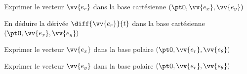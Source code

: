 \debutEntrainement


\begin{enonce}
	Exprimer le vecteur  $\vv{e_r}$ dans la base 
	cartésienne $(\ptO, \vv{e_x}, \vv{e_y})$
\end{enonce}





\begin{enonce}
En déduire la dérivée  $\diff{\vv{e_r}}{t}$ dans la base 
cartésienne $(\ptO, \vv{e_x}, \vv{e_y})$
\end{enonce}





\begin{enonce}
	Exprimer le vecteur   $\vv{e_x}$ dans la base 
	polaire $(\ptO, \vv{e_r}, \vv{e_\theta})$
\end{enonce}





\begin{enonce}
	Exprimer le vecteur  $\vv{e_y}$ dans la base 
	polaire $(\ptO, \vv{e_r}, \vv{e_\theta})$
\end{enonce}





